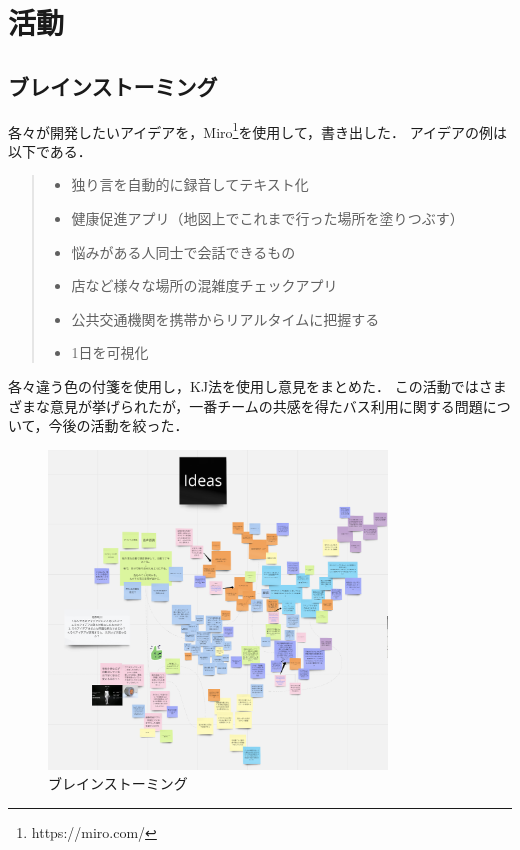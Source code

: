 \chapter{活動}
\section{ブレインストーミング}
各々が開発したいアイデアを，Miro\footnote{https://miro.com/}を使用して，書き出した．
アイデアの例は以下である．

\begin{quote}
    \begin{itemize}
        \item 独り言を自動的に録音してテキスト化
        \item 健康促進アプリ（地図上でこれまで行った場所を塗りつぶす）
        \item 悩みがある人同士で会話できるもの
        \item 店など様々な場所の混雑度チェックアプリ
        \item 公共交通機関を携帯からリアルタイムに把握する
        \item 1日を可視化
    \end{itemize}
\end{quote}

各々違う色の付箋を使用し，KJ法を使用し意見をまとめた．
この活動ではさまざまな意見が挙げられたが，一番チームの共感を得たバス利用に関する問題について，今後の活動を絞った．

\begin{figure}[H]
    \centering
    \includegraphics[width=9cm]{images/brainstorm.png}
    \caption{ブレインストーミング}
    \label{fig:brainstorm}
\end{figure}

